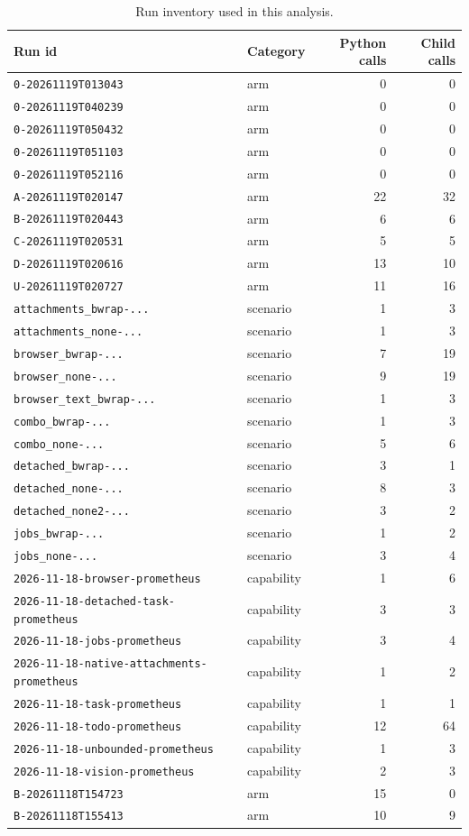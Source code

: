 \documentclass[11pt]{article}
\newcommand{\code}[1]{\texttt{#1}}
\begin{document}
\begin{table}[h]
\centering
\small
\begin{tabular}{p{6.2cm}p{3.6cm}rr}
\toprule
\textbf{Run id} & \textbf{Category} & \textbf{Python calls} & \textbf{Child calls} \\
\midrule
\code{0-20261119T013043} & arm & 0 & 0 \\
\code{0-20261119T040239} & arm & 0 & 0 \\
\code{0-20261119T050432} & arm & 0 & 0 \\
\code{0-20261119T051103} & arm & 0 & 0 \\
\code{0-20261119T052116} & arm & 0 & 0 \\
\code{A-20261119T020147} & arm & 22 & 32 \\
\code{B-20261119T020443} & arm & 6 & 6 \\
\code{C-20261119T020531} & arm & 5 & 5 \\
\code{D-20261119T020616} & arm & 13 & 10 \\
\code{U-20261119T020727} & arm & 11 & 16 \\
\code{attachments\_bwrap-...} & scenario & 1 & 3 \\
\code{attachments\_none-...} & scenario & 1 & 3 \\
\code{browser\_bwrap-...} & scenario & 7 & 19 \\
\code{browser\_none-...} & scenario & 9 & 19 \\
\code{browser\_text\_bwrap-...} & scenario & 1 & 3 \\
\code{combo\_bwrap-...} & scenario & 1 & 3 \\
\code{combo\_none-...} & scenario & 5 & 6 \\
\code{detached\_bwrap-...} & scenario & 3 & 1 \\
\code{detached\_none-...} & scenario & 8 & 3 \\
\code{detached\_none2-...} & scenario & 3 & 2 \\
\code{jobs\_bwrap-...} & scenario & 1 & 2 \\
\code{jobs\_none-...} & scenario & 3 & 4 \\
\code{2026-11-18-browser-prometheus} & capability & 1 & 6 \\
\code{2026-11-18-detached-task-prometheus} & capability & 3 & 3 \\
\code{2026-11-18-jobs-prometheus} & capability & 3 & 4 \\
\code{2026-11-18-native-attachments-prometheus} & capability & 1 & 2 \\
\code{2026-11-18-task-prometheus} & capability & 1 & 1 \\
\code{2026-11-18-todo-prometheus} & capability & 12 & 64 \\
\code{2026-11-18-unbounded-prometheus} & capability & 1 & 3 \\
\code{2026-11-18-vision-prometheus} & capability & 2 & 3 \\
\code{B-20261118T154723} & arm & 15 & 0 \\
\code{B-20261118T155413} & arm & 10 & 9 \\
\bottomrule
\end{tabular}
\caption{Run inventory used in this analysis.}
\end{table}
\end{document}
